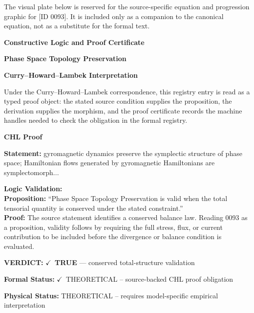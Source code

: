\begingroup\footnotesize\sloppy
The visual plate below is reserved for the source-specific equation and progression graphic for [ID 0093]. It is included only as a companion to the canonical equation, not as a substitute for the formal text.
\par\endgroup
\ifTZPDarkEdition
{}
\fi

\clearpage
\begingroup\tzpsupportsetup
\noindent\textbf{\fontsize{10.8pt}{12.8pt}\selectfont [ID 0093] Constructive Logic and Proof Certificate}\par
\noindent\textbf{\fontsize{10pt}{12pt}\selectfont Phase Space Topology Preservation}\par
\vspace{0.45em}
\begingroup
\footnotesize
\setlength{\parskip}{0.22em}
\setlength{\parindent}{0pt}
\noindent\textbf{Curry--Howard--Lambek Interpretation}\par
Under the Curry--Howard--Lambek correspondence, this registry entry is read as a typed proof
object: the stated source condition supplies the proposition, the derivation supplies the
morphism, and the proof certificate records the machine handles needed to check the obligation
in the formal registry.

\vspace{0.45em}
\noindent\textbf{CHL Proof}\par
\textbf{Statement:} gyromagnetic dynamics preserve the symplectic structure of phase space; Hamiltonian
flows generated by gyromagnetic Hamiltonians are symplectomorph...

\textbf{Logic Validation:}\\
\textbf{Proposition:} ``Phase Space Topology Preservation is valid when the total tensorial quantity is
conserved under the stated constraint.''\\
\textbf{Proof:} The source statement identifies a conserved balance law. Reading 0093 as a proposition,
validity follows by requiring the full stress, flux, or current contribution to be
included before the divergence or balance condition is evaluated.

\textbf{VERDICT:} \ensuremath{\checkmark}\ \textbf{TRUE} --- conserved total-structure validation

\textbf{Formal Status:} \ensuremath{\checkmark}\ THEORETICAL -- source-backed CHL proof obligation

\textbf{Physical Status:} THEORETICAL -- requires model-specific empirical interpretation
\par\vspace{0.45em}
\par
\ifTZPDarkEdition
{}
\fi
\endgroup
\endgroup
